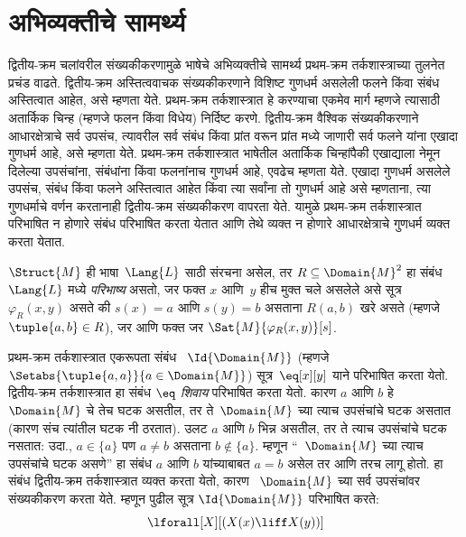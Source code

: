 \section{अभिव्यक्तीचे सामर्थ्य}\label{sol:syn:exp:sec}

\begin{explain}
द्वितीय-क्रम
चलांवरील
संख्यकीकरणामुळे
भाषेचे अभिव्यक्तीचे
सामर्थ्य प्रथम-क्रम
तर्कशास्त्राच्या
तुलनेत प्रचंड
वाढते.
द्वितीय-क्रम
अस्तित्ववाचक
संख्यकीकरणाने
विशिष्ट गुणधर्म
असलेली फलने
किंवा संबंध
अस्तित्वात आहेत,
असे म्हणता येते.
प्रथम-क्रम
तर्कशास्त्रात
हे करण्याचा
एकमेव मार्ग
म्हणजे त्यासाठी
अतार्किक चिन्ह
(म्हणजे फलन
किंवा विधेय)
निर्दिष्ट करणे.
द्वितीय-क्रम
वैश्विक संख्यकीकरणाने
आधारक्षेत्राचे
सर्व उपसंच,
त्यावरील सर्व
संबंध किंवा
प्रांत वरून
प्रांत मध्ये
जाणारी सर्व
फलने यांना
एखादा गुणधर्म
आहे, असे
म्हणता येते.
प्रथम-क्रम
तर्कशास्त्रात
भाषेतील अतार्किक
चिन्हांपैकी
एखाद्याला
नेमून दिलेल्या
उपसंचांना,
संबंधांना किंवा
फलनांनाच
गुणधर्म आहे,
एवढेच म्हणता
येते.
एखादा गुणधर्म
असलेले उपसंच,
संबंध किंवा
फलने अस्तित्वात
आहेत किंवा
त्या सर्वांना
तो गुणधर्म
आहे असे म्हणताना,
त्या गुणधर्माचे
वर्णन करतानाही
द्वितीय-क्रम
संख्यकीकरण
वापरता येते.
यामुळे प्रथम-क्रम
तर्कशास्त्रात
परिभाषित न
होणारे संबंध
परिभाषित करता
येतात आणि
तेथे व्यक्त न
होणारे आधारक्षेत्राचे
गुणधर्म व्यक्त
करता येतात.
\end{explain}

\begin{defn}
$\Struct{M}$ ही
भाषा~$\Lang{L}$
साठी संरचना
असेल, तर
$R \subseteq \Domain{M}^2$
हा संबंध~$\Lang{L}$
मध्ये \emph{परिभाष्य}
असतो, जर फक्त
$x$ आणि~$y$
हीच मुक्त चले
असलेले असे
सूत्र~$\varphi_R(x, y)$
असते की
$s(x) = a$
आणि $s(y) = b$
असताना
$R(a, b)$
खरे असते
(म्हणजे
$\tuple{a,b} \in R$),
जर आणि फक्त
जर
$\Sat{M}{\varphi_R(x, y)}[s]$.
\end{defn}

\begin{ex}
प्रथम-क्रम
तर्कशास्त्रात
एकरूपता संबंध~
$\Id{\Domain{M}}$
(म्हणजे
$\Setabs{\tuple{a,a}}{a \in
  \Domain{M}}$)
सूत्र~$\eq[x][y]$
याने परिभाषित
करता येतो.
द्वितीय-क्रम
तर्कशास्त्रात
हा संबंध
\emph{$\eq$ शिवाय}
परिभाषित
करता येतो.
कारण $a$
आणि $b$
हे~$\Domain{M}$
चे तेच
घटक
असतील, तर
ते~$\Domain{M}$
च्या त्याच
उपसंचांचे
घटक
असतात (कारण
संच त्यांतील
घटक
नी ठरतात).
उलट $a$
आणि $b$
भिन्न असतील,
तर ते त्याच
उपसंचांचे
घटक
नसतात:
उदा.,
$a \in \{a\}$
पण $a \neq b$
असताना
$b
\notin \{a\}$.
म्हणून
“~$\Domain{M}$
च्या त्याच
उपसंचांचे
घटक
असणे” हा
संबंध $a$
आणि $b$
यांच्याबाबत
$a = b$
असेल तर आणि
तरच लागू
होतो.
हा संबंध
द्वितीय-क्रम
तर्कशास्त्रात
व्यक्त करता
येतो, कारण
~$\Domain{M}$
च्या सर्व
उपसंचांवर
संख्यकीकरण
करता येते.
म्हणून पुढील
सूत्र
$\Id{\Domain{M}}$
परिभाषित करते:
\[\lforall[X][(X(x) \liff X(y))]
\]
\end{ex}

